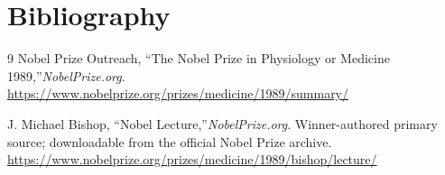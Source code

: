 \section{Bibliography}

\begin{thebibliography}{9}
Nobel Prize Outreach, ``The Nobel Prize in Physiology or Medicine 1989,''\emph{NobelPrize.org}.\\
\url{https://www.nobelprize.org/prizes/medicine/1989/summary/}

J. Michael Bishop, ``Nobel Lecture,''\emph{NobelPrize.org}. Winner-authored primary source; downloadable from the official Nobel Prize archive.\\
\url{https://www.nobelprize.org/prizes/medicine/1989/bishop/lecture/}
\end{thebibliography}
